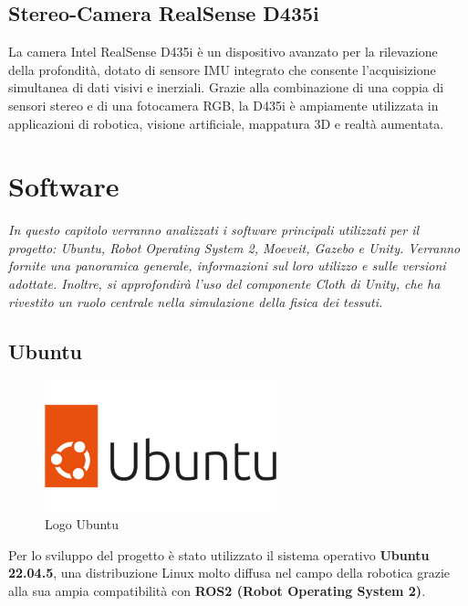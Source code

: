 \documentclass[11pt]{report}
\begin{document}
\subsection{Stereo-Camera RealSense D435i}
La camera Intel RealSense D435i è un dispositivo avanzato per la rilevazione della profondità, dotato di sensore IMU integrato che consente l'acquisizione simultanea di dati visivi e inerziali. Grazie alla combinazione di una coppia di sensori stereo e di una fotocamera RGB, la D435i è ampiamente utilizzata in applicazioni di robotica, visione artificiale, mappatura 3D e realtà aumentata.

\section{Software}
\textit{In questo capitolo verranno analizzati i software principali utilizzati per il progetto: Ubuntu, Robot Operating System 2, Moeveit, Gazebo e Unity. Verranno fornite una panoramica generale, informazioni sul loro utilizzo e sulle versioni adottate. Inoltre, si approfondirà l'uso del componente Cloth di Unity, che ha rivestito un ruolo centrale nella simulazione della fisica dei tessuti.}

\subsection{Ubuntu}

\begin{figure}[H]
    \centering
    \includegraphics[width=0.6\textwidth]{images/ubuntu1.png}
    \caption{Logo Ubuntu}
    \label{fig:Ubuntu}
\end{figure}

Per lo sviluppo del progetto è stato utilizzato il sistema operativo \textbf{Ubuntu 22.04.5}, una distribuzione Linux molto diffusa nel campo della robotica grazie alla sua ampia compatibilità con \textbf{ROS2 (Robot Operating System 2)}.
\end{document}
